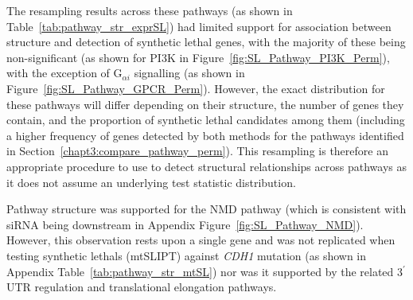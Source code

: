 The resampling results across these \glspl{pathway} (as shown in Table~\ref{tab:pathway_str_exprSL}) had limited support for association between  structure and detection of \gls{synthetic lethal} genes, with the majority of these being non-significant (as shown for PI3K in Figure~\ref{fig:SL_Pathway_PI3K_Perm}), with the exception of G$_{\alpha i}$ signalling (as shown in Figure~\ref{fig:SL_Pathway_GPCR_Perm}). However, the exact distribution for these \glspl{pathway} will differ depending on their structure, the number of genes they contain, and the proportion of \gls{synthetic lethal} candidates among them (including a higher frequency of genes detected by both methods for the \glspl{pathway} identified in Section~\ref{chapt3:compare_pathway_perm}). This resampling is therefore an appropriate procedure to use to detect structural relationships across \glspl{pathway} as it does not assume an underlying test statistic distribution.

Pathway structure was supported for the \gls{NMD} \gls{pathway} (which is consistent with \gls{siRNA} being downstream in Appendix Figure~\ref{fig:SL_Pathway_NMD}). However, this observation rests upon a single gene and was not replicated when testing \glspl{synthetic lethal} (\acrshort{mtSLIPT}) against \textit{CDH1} \gls{mutation} (as shown in Appendix Table~\ref{tab:pathway_str_mtSL}) nor was it supported by the related 3$^\prime$\gls{UTR} regulation and translational elongation \glspl{pathway}.

